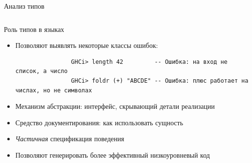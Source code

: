 \begin{frame}{Анализ типов}
\begin{columns}[onlytextwidth]
\begin{column}[t]{0.62\textwidth}
\begin{center}
                \end{center}
            \end{column}
        \end{columns}
    \end{frame}

    \begin{frame}[fragile]{Роль типов в языках}
        \begin{itemize}
            \item Позволяют выявлять некоторые классы ошибок:
            \begin{verbatim}
                GHCi> length 42         -- Ошибка: на вход не список, а число
                GHCi> foldr (+) "ABCDE" -- Ошибка: плюс работает на числах, но не символах
            \end{verbatim}
            \item Механизм абстракции: интерфейс, скрывающий детали реализации
            \item Средство документирования: как использовать сущность
            \item \textit{Частичная} спецификация поведения
            \item Позволяют генерировать более эффективный низкоуровневый код
        \end{itemize}
    \end{frame}

